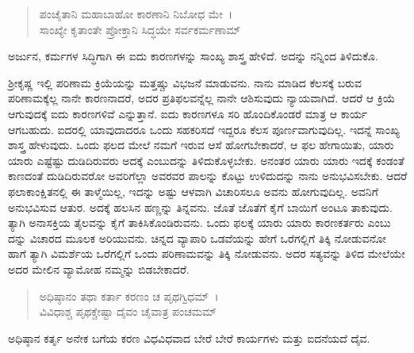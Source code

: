 \begin{verse}
ಪಂಚೈತಾನಿ ಮಹಾಬಾಹೋ ಕಾರಣಾನಿ ನಿಬೋಧ ಮೇ~।\\ಸಾಂಖ್ಯೇ ಕೃತಾಂತೇ ಪ್ರೋಕ್ತಾನಿ ಸಿದ್ಧಯೇ ಸರ್ವಕರ್ಮಣಾಮ್ 
\end{verse}

{\small ಅರ್ಜುನ, ಕರ್ಮಗಳ ಸಿದ್ಧಿಗಾಗಿ ಈ ಐದು ಕಾರಣಗಳನ್ನು ಸಾಂಖ್ಯ ಶಾಸ್ತ್ರ ಹೇಳಿದೆ. ಅದನ್ನು ನನ್ನಿಂದ ತಿಳಿದುಕೊ.}

ಶ‍್ರೀಕೃಷ್ಣ ಇಲ್ಲಿ ಪರಿಣಾಮ ಕ್ರಿಯೆಯನ್ನು ಮತ್ತಷ್ಚು ವಿಭಜನೆ ಮಾಡುವನು. ನಾನು ಮಾಡಿದ ಕೆಲಸಕ್ಕೆ ಬರುವ ಪರಿಣಾಮಕ್ಕೆಲ್ಲ ನಾನೇ ಕಾರಣನಾದರೆ, ಅದರ ಪ್ರತಿಫಲವನ್ನೆಲ್ಲ ನಾನೇ ಆಶಿಸುವುದು ನ್ಯಾಯವಾಗಿದೆ. ಆದರೆ ಆ ಕ್ರಿಯೆ ಆಗುವುದಕ್ಕೆ ಐದು ಕಾರಣಗಳಿವೆ ಎನ್ನುತ್ತಾನೆ. ಐದು ಕಾರಣಗಳೂ ಸರಿ ಹೊಂದಿಕೊಂಡರೆ ಮಾತ್ರ ಆ ಕಾರ್ಯ ಆಗಬಹುದು. ಐದರಲ್ಲಿ ಯಾವುದಾದರೂ ಒಂದು ಸಹಕರಿಸದೆ ಇದ್ದರೂ ಕೆಲಸ ಪೂರ್ಣವಾಗುವುದಿಲ್ಲ. ಇದನ್ನೆ ಸಾಂಖ್ಯ ಶಾಸ್ತ್ರ ಹೇಳುವುದು. ಒಂದು ಫಲದ ಮೇಲೆ ನಮಗೆ ಇರುವ ಆಸೆ ಹೋಗಬೇಕಾದರೆ, ಆ ಫಲ ಹೇಗಾಯಿತು, ಯಾರು ಯಾರು ಎಷ್ಟೆಷ್ಟು ದುಡಿದಿರುವರು ಅದಕ್ಕೆ ಎಂಬುದನ್ನು ತಿಳಿದುಕೊಳ್ಳಬೇಕು. ಅನಂತರ ಯಾರು ಯಾರು ಇದಕ್ಕೆ ಕಂಡಂತೆ ಕಾಣದಂತೆ ದುಡಿದಿರುವರೋ ಅವರಿಗೆಲ್ಲಾ ಅವರವರ ಪಾಲನ್ನು ಕೊಟ್ಟು ಉಳಿದುದನ್ನು ನಾನು ಅನುಭವಿಸಬೇಕು. ಆದರೆ ಫಲಾಕಾಂಕ್ಷಿತನಲ್ಲಿ ಈ ತಾಳ್ಮೆಯಿಲ್ಲ, ಇದನ್ನು ಅಷ್ಟು ಆಳವಾಗಿ ವಿಚಾರಿಸಲೂ ಅವನು ಹೋಗುವುದಿಲ್ಲ. ಅವನಿಗೆ ಅನುಭವಿಸುವ ಆತುರ. ಅದಕ್ಕೆ ಹಲಸಿನ ಹಣ್ಣನ್ನು ತಿನ್ನವನು. ಜೊತೆ ಜೊತೆಗೆ ಕೈಗೆ ಬಾಯಿಗೆ ಅಂಟೂ ತಾಕುವುದು. ತ್ಯಾಗಿ ಅನಾಸಕ್ತಿಯ ತೈಲವನ್ನು ಕೈಗೆ ತಾಕಿಸಿಕೊಂಡಿರುವನು. ಒಂದು ಫಲಕ್ಕೆ ಯಾರು ಯಾರು ಕಾರಣಕರ್ತರು ಎಂಬು ದನ್ನು ವಿಚಾರದ ಮೂಲಕ ಅರಿಯುವನು. ಚಿನ್ನದ ವ್ಯಾಪಾರಿ ಒಡವೆಯನ್ನು ಹೇಗೆ ಒರೆಗಲ್ಲಿಗೆ ತಿಕ್ಕಿ ನೋಡುವನೋ ಹಾಗೆ ತ್ಯಾಗಿ ವಿಮರ್ಶೆಯ ಒರೆಗಲ್ಲಿಗೆ ಒಂದು ಪರಿಣಾಮವನ್ನು ತಿಕ್ಕಿ ನೋಡುವನು. ಅದರ ಸತ್ಯವನ್ನು ತಿಳಿದ ಮೇಲೆಯೇ ಅದರ ಮೇಲಿನ ವ್ಯಾಮೋಹ ನಮ್ಮನ್ನು ಬಿಡಬೇಕಾದರೆ.

\begin{verse}
ಅಧಿಷ್ಠಾನಂ ತಥಾ ಕರ್ತಾ ಕರಣಂ ಚ ಪೃಥಗ್ವಿಧಮ್~।\\ವಿವಿಧಾಶ್ಚ ಪೃಥಕ್ಚೇಷ್ಟಾ ದೈವಂ ಚೈವಾತ್ರ ಪಂಚಮಮ್ 
\end{verse}

{\small ಅಧಿಷ್ಠಾನ ಕರ್ತೃ ಅನೇಕ ಬಗೆಯ ಕರಣ ವಿಧವಿಧವಾದ ಬೇರೆ ಬೇರೆ ಕಾರ್ಯಗಳು ಮತ್ತು ಐದನೆಯದೆ ದೈವ.}

